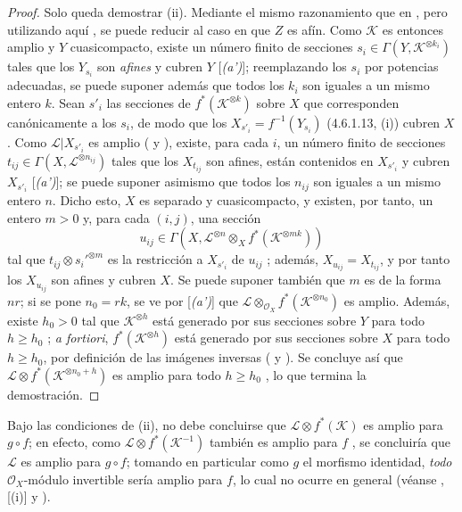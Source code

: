 \documentclass[oneside,10pt]{amsart}
\renewcommand{\geq}{\geqslant}
\newcommand{\oldpage}[2][]{\marginnote{\normalfont\footnotesize\textbf{#1}~|~#2}\ignorespaces}
\let\EGAOriginalLabel\label
\renewcommand{\label}[1]{\phantomsection\EGAOriginalLabel{#1}}
\begin{document}
\begin{proof}
Solo queda demostrar (ii).
Mediante el mismo razonamiento que en , pero utilizando aquí , se puede reducir al caso en que $Z$ es afín.
Como $\mathcal{K}$ es entonces amplio y $Y$ cuasicompacto, existe un número finito de secciones $s_i\in\Gamma(Y,\mathcal{K}^{\otimes k_i})$ tales que los $Y_{s_i}$
\oldpage[II]{93}
son \emph{afines} y cubren $Y$ [\emph{(a')}];
reemplazando los $s_i$ por potencias adecuadas, se puede suponer además que todos los $k_i$ son iguales a un mismo entero $k$.
Sean $s'_i$ las secciones de $f^*(\mathcal{K}^{\otimes k})$ sobre $X$ que corresponden canónicamente a los $s_i$, de modo que los $X_{s'_i}=f^{-1}(Y_{s_i})$ (4.6.1.13, (i)) cubren $X$.
Como $\mathcal{L}|X_{s'_i}$ es amplio ( y ), existe, para cada $i$, un número finito de secciones $t_{ij}\in\Gamma(X,\mathcal{L}^{\otimes n_{ij}})$ tales que los $X_{t_{ij}}$ son afines, están contenidos en $X_{s'_i}$ y cubren $X_{s'_i}$ [\emph{(a')}];
se puede suponer asimismo que todos los $n_{ij}$ son iguales a un mismo entero $n$.
Dicho esto, $X$ es separado y cuasicompacto, y existen, por tanto, un entero $m>0$ y, para cada $(i,j)$, una sección
\[
  u_{ij}\in\Gamma(X,\mathcal{L}^{\otimes n}\otimes_X
  f^*(\mathcal{K}^{\otimes mk}))
\]
tal que $t_{ij}\otimes s_i'^{\otimes m}$ es la restricción a $X_{s'_i}$ de $u_{ij}$ ;
además, $X_{u_{ij}}=X_{t_{ij}}$, y por tanto los $X_{u_{ij}}$ son afines y cubren $X$.
Se puede suponer también que $m$ es de la forma $nr$;
si se pone $n_0=rk$, se ve por [\emph{(a')}] que $\mathcal{L}\otimes_{\mathcal{O}_X}f^*(\mathcal{K}^{\otimes n_0})$ es amplio.
Además, existe $h_0>0$ tal que $\mathcal{K}^{\otimes h}$ está generado por sus secciones sobre $Y$ para todo $h\geq h_0$ ;
\emph{a fortiori}, $f^*(\mathcal{K}^{\otimes h})$ está generado por sus secciones sobre $X$ para todo $h\geq h_0$, por definición de las imágenes inversas ( y ).
Se concluye así que $\mathcal{L}\otimes f^*(\mathcal{K}^{\otimes n_0+h})$ es amplio para todo $h\geq h_0$ , lo que termina la demostración.
\end{proof}

\begin{remark}[4.6.14]
\label{II.4.6.14-fr}
Bajo las condiciones de (ii), no debe concluirse que $\mathcal{L}\otimes f^*(\mathcal{K})$ es amplio para $g\circ f$;
en efecto, como $\mathcal{L}\otimes f^*(\mathcal{K}^{-1})$ también es amplio para $f$ , se concluiría que $\mathcal{L}$ es amplio para $g\circ f$;
tomando en particular como $g$ el morfismo identidad, \emph{todo} $\mathcal{O}_X$-módulo invertible sería amplio para $f$, lo cual no ocurre en general (véanse , [(i)] y ).
\end{remark}
\end{document}
